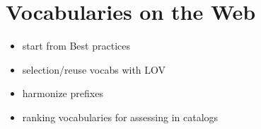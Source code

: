 \chapter{Vocabularies on the Web}
\label{ch:ch6}

\begin{itemize}
\item start from Best practices
\item selection/reuse vocabs with LOV
\item harmonize prefixes
\item ranking vocabularies for assessing in catalogs
\end{itemize}